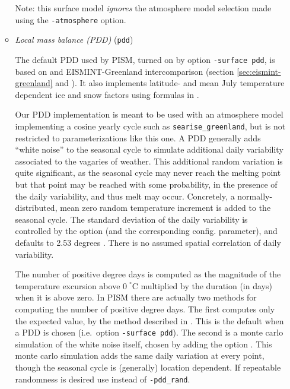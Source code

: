 \begin{enumerate}
\begin{itemize}
    Note: this surface model \emph{ignores}  the atmosphere model selection made using the \texttt{-atmosphere} option.

  \item \emph{Local mass balance (PDD)} (\texttt{pdd})    

   The default PDD used by PISM, turned on by option \texttt{-surface pdd}, is based on \cite{CalovGreve05} and EISMINT-Greenland intercomparison (section \ref{sec:eismint-greenland} and \cite{RitzEISMINT}). It also implements latitude- and mean July temperature dependent ice and snow factors using formulas in \cite{Faustoetal2009}.

   Our PDD implementation is meant to be used with an atmosphere model implementing a cosine yearly cycle such as \texttt{searise_greenland}, but is not restricted to parameterizations like this one. A PDD generally adds ``white noise'' to the seasonal cycle to simulate additional daily variability associated to the vagaries of weather.  This additional random variation is quite significant, as the seasonal cycle may never reach the melting point but that point may be reached with some probability, in the presence of the daily variability, and thus melt may occur.  Concretely, a normally-distributed, mean zero random temperature increment is added to the seasonal cycle.  The standard deviation of the daily variability is controlled by the  option (and the corresponding config. parameter), and defaults to 2.53 degrees \cite{Faustoetal2009}. There is no assumed spatial correlation of daily variability.

The number of positive degree days is computed as the magnitude of the temperature excursion above $0\!\phantom{|}^\circ \text{C}$ multiplied by the duration (in days) when it is above zero.  In PISM there are actually two methods for computing the number of positive degree days.  The first computes only the expected value, by the method described in \cite{CalovGreve05}.  This is the default when a PDD is chosen (i.e.~option \texttt{-surface pdd}).  The second is a monte carlo simulation of the white noise itself, chosen by adding the option .  This monte carlo simulation adds the same daily variation at every point, though the seasonal cycle is (generally) location dependent.  If repeatable randomness is desired use  instead of \texttt{-pdd_rand}.


\end{itemize}
\end{enumerate}
